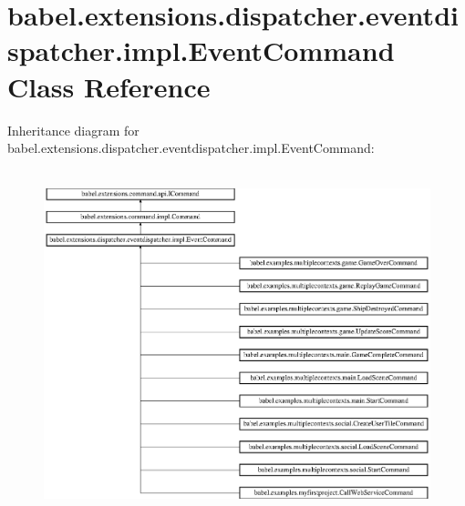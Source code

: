 \hypertarget{classbabel_1_1extensions_1_1dispatcher_1_1eventdispatcher_1_1impl_1_1_event_command}{\section{babel.\-extensions.\-dispatcher.\-eventdispatcher.\-impl.\-Event\-Command Class Reference}
\label{classbabel_1_1extensions_1_1dispatcher_1_1eventdispatcher_1_1impl_1_1_event_command}
}
Inheritance diagram for babel.\-extensions.\-dispatcher.\-eventdispatcher.\-impl.\-Event\-Command\-:\begin{figure}[H]
\begin{center}
\leavevmode
\includegraphics[height=10.103093cm]{classbabel_1_1extensions_1_1dispatcher_1_1eventdispatcher_1_1impl_1_1_event_command}
\end{center}
\end{figure}
